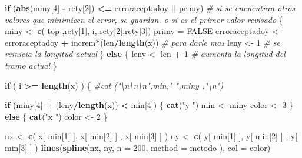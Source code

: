 \documentclass[]{article}
\newenvironment{Shaded}{\begin{snugshade}}{\end{snugshade}}
\newcommand{\KeywordTok}[1]{\textcolor[rgb]{0.13,0.29,0.53}{\textbf{#1}}}
\newcommand{\DataTypeTok}[1]{\textcolor[rgb]{0.13,0.29,0.53}{#1}}
\newcommand{\DecValTok}[1]{\textcolor[rgb]{0.00,0.00,0.81}{#1}}
\newcommand{\StringTok}[1]{\textcolor[rgb]{0.31,0.60,0.02}{#1}}
\newcommand{\CommentTok}[1]{\textcolor[rgb]{0.56,0.35,0.01}{\textit{#1}}}
\newcommand{\OtherTok}[1]{\textcolor[rgb]{0.56,0.35,0.01}{#1}}
\newcommand{\ControlFlowTok}[1]{\textcolor[rgb]{0.13,0.29,0.53}{\textbf{#1}}}
\newcommand{\OperatorTok}[1]{\textcolor[rgb]{0.81,0.36,0.00}{\textbf{#1}}}
\newcommand{\NormalTok}[1]{#1}
\begin{document}
\begin{Shaded}
\begin{Highlighting}[]
      \ControlFlowTok{if}\NormalTok{ (}\KeywordTok{abs}\NormalTok{(miny[}\DecValTok{4}\NormalTok{] }\OperatorTok{-}\StringTok{ }\NormalTok{rety[}\DecValTok{2}\NormalTok{]) }\OperatorTok{<=}\StringTok{ }\NormalTok{erroraceptadoy }\OperatorTok{||}\StringTok{ }\NormalTok{primy) }\CommentTok{# si se encuentran otros valores que minimicen el error, se guardan. o si es el primer valor revisado}
\NormalTok{      \{}
\NormalTok{        miny <-}\StringTok{ }\KeywordTok{c}\NormalTok{( top ,rety[}\DecValTok{1}\NormalTok{], i, rety[}\DecValTok{2}\NormalTok{],rety[}\DecValTok{3}\NormalTok{])}
\NormalTok{        primy =}\StringTok{ }\OtherTok{FALSE}
\NormalTok{        erroraceptadoy <-}\StringTok{ }\NormalTok{erroraceptadoy }\OperatorTok{+}\StringTok{ }\NormalTok{increm}\OperatorTok{*}\NormalTok{(len}\OperatorTok{/}\KeywordTok{length}\NormalTok{(x)) }\CommentTok{# para darle mas }
\NormalTok{        leny <-}\StringTok{ }\DecValTok{1} \CommentTok{# se reinicia la longitud actual }
\NormalTok{      \}}
      \ControlFlowTok{else}
\NormalTok{      \{}
\NormalTok{        leny <-}\StringTok{ }\NormalTok{len }\OperatorTok{+}\StringTok{ }\DecValTok{1} \CommentTok{# aumenta la longitud del tramo actual}
\NormalTok{      \}}
      
      \ControlFlowTok{if}\NormalTok{ ( i }\OperatorTok{>=}\StringTok{ }\KeywordTok{length}\NormalTok{(x) )}
\NormalTok{      \{}
        \CommentTok{#cat ("\textbackslash{}n\textbackslash{}n\textbackslash{}n",min,"      ",miny ,"\textbackslash{}n")}
        
        \ControlFlowTok{if}\NormalTok{ (miny[}\DecValTok{4}\NormalTok{] }\OperatorTok{+}\StringTok{ }\NormalTok{(leny}\OperatorTok{/}\KeywordTok{length}\NormalTok{(x)) }\OperatorTok{<}\StringTok{ }\NormalTok{min[}\DecValTok{4}\NormalTok{])}
\NormalTok{        \{}
          \KeywordTok{cat}\NormalTok{(}\StringTok{"y "}\NormalTok{)}
\NormalTok{          min <-}\StringTok{ }\NormalTok{miny}
\NormalTok{          color <-}\StringTok{ }\DecValTok{3}
\NormalTok{        \}}
        \ControlFlowTok{else}
\NormalTok{        \{}
          \KeywordTok{cat}\NormalTok{(}\StringTok{"x "}\NormalTok{)}
\NormalTok{          color <-}\StringTok{ }\DecValTok{2}
\NormalTok{        \}}
        
\NormalTok{        nx <-}\StringTok{ }\KeywordTok{c}\NormalTok{( x[ min[}\DecValTok{1}\NormalTok{] ], x[ min[}\DecValTok{2}\NormalTok{] ] , x[ min[}\DecValTok{3}\NormalTok{] ] )}
\NormalTok{        ny <-}\StringTok{ }\KeywordTok{c}\NormalTok{( y[ min[}\DecValTok{1}\NormalTok{] ], y[ min[}\DecValTok{2}\NormalTok{] ] , y[ min[}\DecValTok{3}\NormalTok{] ] )}
        \KeywordTok{lines}\NormalTok{(}\KeywordTok{spline}\NormalTok{(nx, ny, }\DataTypeTok{n =} \DecValTok{200}\NormalTok{, }\DataTypeTok{method =}\NormalTok{ metodo ), }\DataTypeTok{col =}\NormalTok{ color)}
        

\end{Highlighting}
\end{Shaded}
\end{document}
